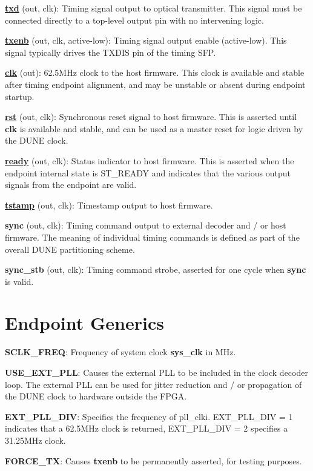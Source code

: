 \documentclass[fleqn,12pt,a4paper]{olplainarticle}
\begin{document}
\textbf{\uline{txd}} (out, clk): Timing signal output to optical transmitter. This signal must be connected directly to a top-level output pin with no intervening logic.

\textbf{\uline{txenb}} (out, clk, active-low): Timing signal output enable (active-low). This signal typically drives the TXDIS pin of the timing SFP.

\textbf{\uline{clk}} (out): 62.5MHz clock to the host firmware. This clock is available and stable after timing endpoint alignment, and may be unstable or absent during endpoint startup.

\textbf{\uline{rst}} (out, clk): Synchronous reset signal to host firmware. This is asserted until \textbf{clk} is available and stable, and can be used as a master reset for logic driven by the DUNE clock.

\textbf{\uline{ready}} (out, clk): Status indicator to host firmware. This is asserted when the endpoint internal state is ST\_READY and indicates that the various output signals from the endpoint are valid.

\textbf{\uline{tstamp}} (out, clk): Timestamp output to host firmware.

\textbf{sync} (out, clk): Timing command output to external decoder and / or host firmware. The meaning of individual timing commands is defined as part of the overall DUNE partitioning scheme.

\textbf{sync\_stb} (out, clk): Timing command strobe, asserted for one cycle when \textbf{sync} is valid.

\section{Endpoint Generics}



\textbf{SCLK\_FREQ}: Frequency of system clock \textbf{sys\_clk} in MHz.

\textbf{USE\_EXT\_PLL}: Causes the external PLL to be included in the clock decoder loop. The external PLL can be used for jitter reduction and / or propagation of the DUNE clock to hardware outside the FPGA.

\textbf{EXT\_PLL\_DIV}: Specifies the frequency of pll\_clki. EXT\_PLL\_DIV = 1 indicates that a 62.5MHz clock is returned, EXT\_PLL\_DIV = 2 specifies a 31.25MHz clock.

\textbf{FORCE\_TX}: Causes \textbf{txenb} to be permanently asserted, for testing purposes.
\end{document}
